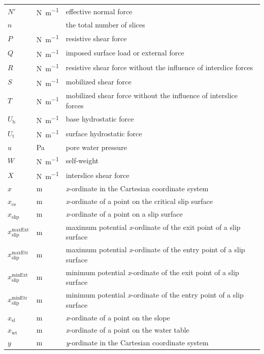 \documentclass[12pt]{article}
\begin{document}
\begin{longtable*}{  l  l  p{8.5cm}  }
$N'$ &\si{\newton\per\meter} & effective normal force
\\
$n$ & & the total number of slices
\\
$P$ & \si{\newton\per\meter} & resistive shear force
\\
$Q$ & \si{\newton\per\meter} & imposed surface load or external force
\\
$R$ & \si{\newton\per\meter} & resistive shear force without the influence of 
interslice forces
\\
$S$ & \si{\newton\per\meter} & mobilized shear force
\\
$T$ & \si{\newton\per\meter} & mobilized shear force without the influence of 
interslice 
forces
\\
${U_{\text{b}}}$ & \si{\newton\per\meter} & base hydrostatic force
\\
${U_{\text{t}}}$ & \si{\newton\per\meter} & surface hydrostatic force
\\
$u$ &\si{\pascal} & pore water pressure
\\
$W$ & \si{\newton\per\meter} & self-weight
\\
$X$ & \si{\newton\per\meter} & interslice shear force
\\
$x$ & \si{\meter}& \textit{x}-ordinate in the Cartesian coordinate system
\\
$x_{\text{cs}}$ & \si{\meter} & \textit{x}-ordinate of a point on the critical 
slip 
surface
\\
${x_{\text{slip}}}$ &  \si{\meter}& \textit{x}-ordinate of a point on a slip 
surface
\\
${x_{\text{slip}}^{\text{maxExt}}}$ &  \si{\meter}& maximum potential 
\textit{x}-ordinate of 
the exit point of a slip surface
\\
${x_{\text{slip}}^{\text{maxEtr}}}$ &  \si{\meter}& maximum potential 
\textit{x}-ordinate 
of the entry point of a slip surface
\\
${x_{\text{slip}}^{\text{minExt}}}$ &  \si{\meter}& minimum potential 
\textit{x}-ordinate of 
the exit point of a slip surface
\\
${x_{\text{slip}}^{\text{minEtr}}}$ &  \si{\meter}& minimum potential 
\textit{x}-ordinate 
of the entry point of a slip surface
\\
${x_{\text{sl}}}$ &  \si{\meter}& \textit{x}-ordinate of a point on the slope
\\
${x_{\text{wt}}}$ & \si{\meter} & \textit{x}-ordinate of a point on the water 
table
\\
$y$ &  \si{\meter}& \textit{y}-ordinate in the Cartesian coordinate system

\end{longtable*}
\end{document}
